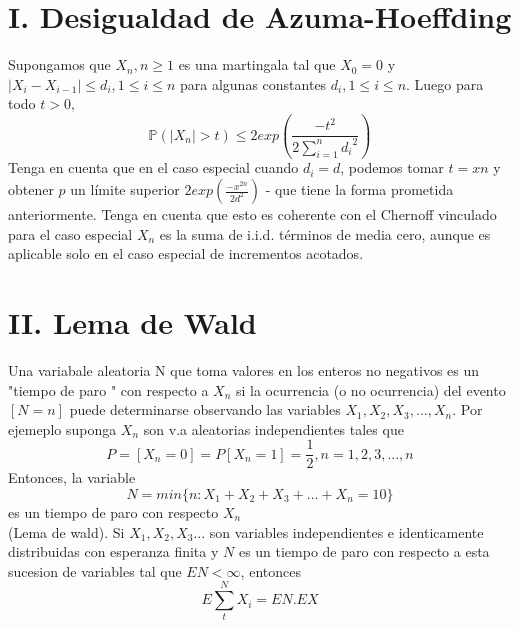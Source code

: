 \documentclass[letterpaper, 10 pt, conference]{ieeeconf}  %
\providecommand{\abs}[1]{\lvert#1\rvert}
\begin{document}
 \section*{ I. Desigualdad de Azuma-Hoeffding}
Supongamos que $X_{n},  n\geq 1$ es una martingala tal que $X_{0}=0$ y $\abs{X_{i}-X_{i-1}}\leq d_{i}, 1\leq i\leq n $ para algunas constantes $d_{i}, 1\leq i \leq n$. Luego para todo $t>0,$\\
\begin{equation*}
  \mathbb{P}(\abs{X_{n}}>t)\leq 2 exp\left(\frac{-t^{2}}{2\sum_{i=1}^{n}{d_{i}}^{2}}\right)
  
\end{equation*}
    Tenga en cuenta que en el caso especial cuando $d_{i} = d$, podemos tomar $t = xn$ y obtener
$p$ un límite superior $2 exp(\frac{-x^{2n}}{2d^{2}})$ - que tiene la forma prometida anteriormente.
Tenga en cuenta que esto es coherente con el Chernoff vinculado para el caso especial $X_{n}$ es
la suma de i.i.d. términos de media cero, aunque es aplicable solo en el caso especial
de incrementos acotados.
\section*{II. Lema de Wald}\label{sec:2.5}
     
     Una variabale aleatoria N que toma valores en los enteros no negativos es un "tiempo de paro " con respecto a ${X_{n}}$ si la ocurrencia (o no ocurrencia) del evento $[N=n]$ puede determinarse observando las variables $X_{1}, X_{2}, X_{3},..., X_{n}$. Por ejemeplo suponga ${X_{n}}$ son v.a aleatorias independientes tales que $$P=[X_{n}=0]=P[X_{n}=1]=\frac{1}{2}  ,  n=1,2,3,...,n$$ Entonces, la variable $$N=min\lbrace{n:X_{1}+ X_{2}+ X_{3}+...+ X_{n}=10}\rbrace$$ es un tiempo de paro con respecto $X_{n}$\\
     (Lema de wald). Si $X_{1}, X_{2}, X_{3}...$ son variables independientes e identicamente distribuidas con esperanza finita y $N$ es un tiempo de paro con respecto a esta sucesion de variables tal que $EN< \infty$, entonces $$E\sum_t^{N}X_{i}=EN.EX$$ 
         
\end{document}
